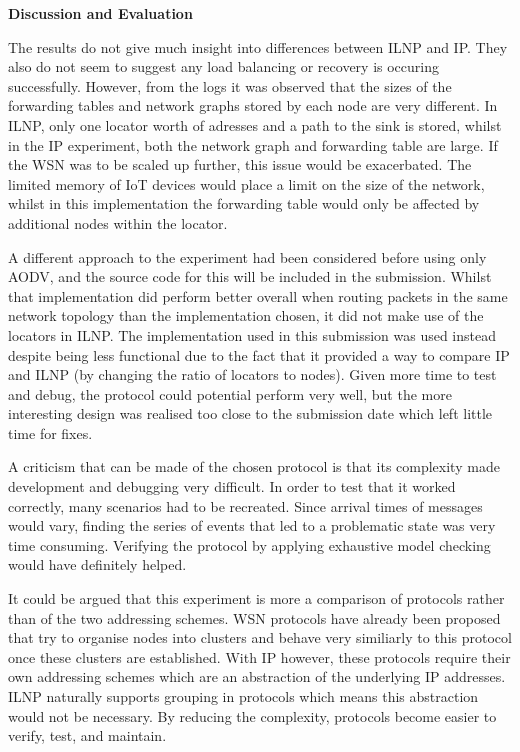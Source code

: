 \documentclass[12pt]{article}
\begin{document}
\medskip
\noindent\textbf{Discussion and Evaluation}

\noindent The results do not give much insight into differences between ILNP and IP. They also do not seem to suggest any load balancing or recovery is occuring successfully. However, from the logs it was observed that the sizes of the forwarding tables and network graphs stored by each node are very different. In ILNP, only one locator worth of adresses and a path to the sink is stored, whilst in the IP experiment, both the network graph and forwarding table are large. If the WSN was to be scaled up further, this issue would be exacerbated. The limited memory of IoT devices would place a limit on the size of the network, whilst in this implementation the forwarding table would only be affected by additional nodes within the locator. 

A different approach to the experiment had been considered before using only AODV, and the source code for this will be included in the submission. Whilst that implementation did perform better overall when routing packets in the same network topology than the implementation chosen, it did not make use of the locators in ILNP. The implementation used in this submission was used instead despite being less functional due to the fact that it provided a way to compare IP and ILNP (by changing the ratio of locators to nodes). Given more time to test and debug, the protocol could potential perform very well, but the more interesting design was realised too close to the submission date which left little time for fixes. 

A criticism that can be made of the chosen protocol is that its complexity made development and debugging very difficult. In order to test that it worked correctly, many scenarios had to be recreated. Since arrival times of messages would vary, finding the series of events that led to a problematic state was very time consuming. Verifying the protocol by applying exhaustive model checking would have definitely helped.

It could be argued that this experiment is more a comparison of protocols rather than of the two addressing schemes. WSN protocols have already been proposed that try to organise nodes into clusters and behave very similiarly to this protocol once these clusters are established. With IP however, these protocols require their own addressing schemes which are an abstraction of the underlying IP addresses. ILNP naturally supports grouping in protocols which means this abstraction would not be necessary. By reducing the complexity, protocols become easier to verify, test, and maintain. 
\end{document}
